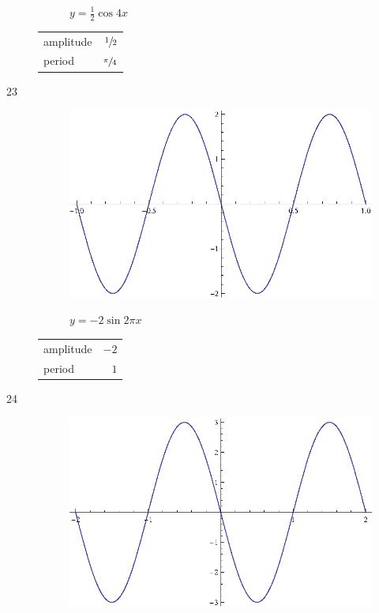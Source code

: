\documentclass{exam}
\begin{document}
\begin{description}
\begin{figure}[H]
          $y = \frac{1}{2} \cos 4x$
        \end{figure}

        \begin{tabular}[H]{lr}
          \toprule
          amplitude & $\sfrac{1}{2}$ \\
          period    & $\sfrac{\pi}{4}$ \\
          \bottomrule
        \end{tabular}

      \item[23]
        \begin{figure}[H]
          \centering
          \includegraphics[scale=0.9]{exercise23.eps}

          $y = -2 \sin 2 \pi x$
        \end{figure}

        \begin{tabular}[H]{lr}
          \toprule
          amplitude & $-2$ \\
          period    & $1$ \\
          \bottomrule
        \end{tabular}

      \item[24]
        \begin{figure}[H]
          \centering
          \includegraphics[scale=0.9]{exercise24.eps}


\end{figure}
\end{description}
\end{document}
